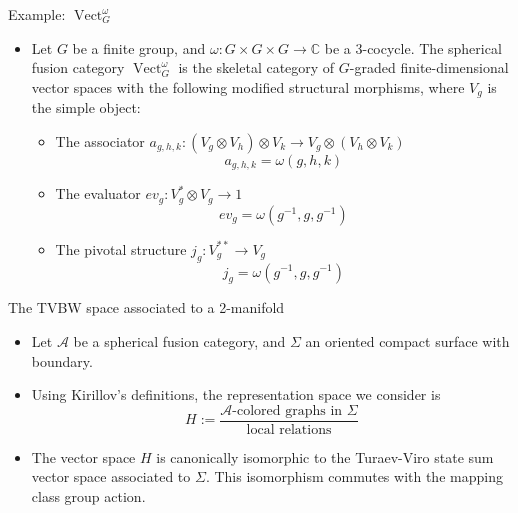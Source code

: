 \documentclass{beamer}
\DeclareMathOperator{\Vect}{Vect}
\begin{document}
\begin{frame}{Example: $\Vect^\omega_G$}
\begin{itemize}
\item  Let $G$ be a finite group, and $\omega: G \times G \times G \to \mathbb{C}$ be a 3-cocycle. The spherical fusion category $\Vect^\omega_G$ is the skeletal category of $G$-graded finite-dimensional vector spaces with the following modified structural morphisms, where $V_g$ is the simple object:   
\begin{itemize} 
\item The associator $a_{g,h,k}:(V_g \otimes V_h) \otimes V_k \to V_g \otimes (V_h \otimes V_k)$
            $$ a_{g,h,k} = \omega(g,h,k)$$
\item The evaluator $ev_g:V_g^* \otimes V_g \to 1$
            $$ ev_g = \omega(g^{-1},g,g^{-1})$$
\item The pivotal structure $j_g:V_g^{**} \to V_g$
            $$ j_g = \omega(g^{-1},g,g^{-1})$$
\end{itemize}
\end{itemize}
\end{frame}


\begin{frame}{The TVBW space associated to a 2-manifold}
  \begin{itemize}
    \item Let $\mathcal A$ be a spherical fusion category, and $\Sigma$ an oriented compact surface with boundary.
    \item 
        Using Kirillov's definitions, the representation space we consider is
        \[
        H := \frac{\text{$\mathcal A$-colored graphs in $\Sigma$}  }
        {\text{local relations}}
       \]
    \pause
    \item The vector space $H$ is canonically isomorphic to the Turaev-Viro state sum vector space associated to $\Sigma$.  This isomorphism commutes with the mapping class group action.
   \end{itemize}
\end{frame}
\end{document}
